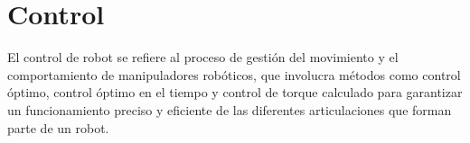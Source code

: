 \section{Control} \label{sec:control}
El control de robot se refiere al proceso de gestión del movimiento y el comportamiento de manipuladores robóticos, que involucra métodos como control óptimo, control óptimo en el tiempo y control de torque calculado para garantizar un funcionamiento preciso y eficiente de las diferentes articulaciones que forman parte de un robot.

